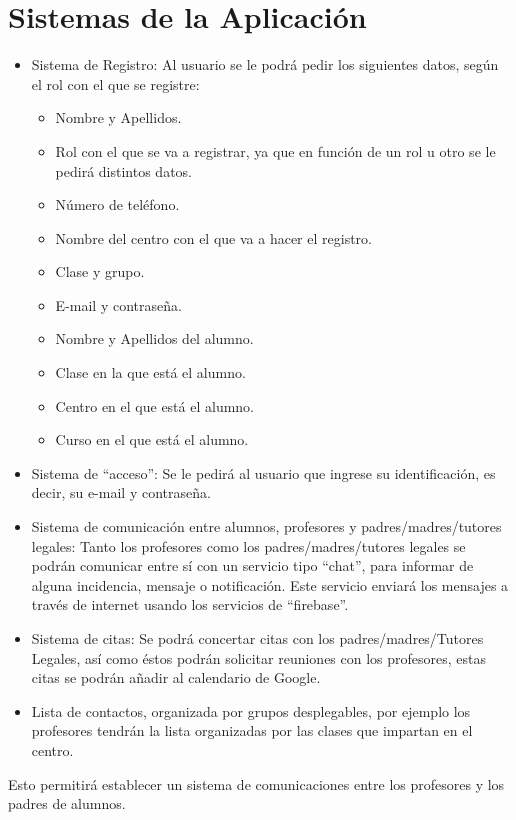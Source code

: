 	\section{Sistemas de la Aplicación}
		\begin{itemize}
			\item Sistema de Registro: Al usuario se le podrá pedir los siguientes datos, según el rol con el que se registre:
			\begin{itemize}
				\item Nombre y Apellidos.
				\item Rol con el que se va a registrar, ya que en función de un rol u otro se le pedirá distintos datos.
				\item Número de teléfono.
				\item Nombre del centro con el que va a hacer el registro.
				\item Clase y grupo.
				\item E-mail y contraseña.
				\item Nombre y Apellidos del alumno.
				\item Clase en la que está el alumno.
				\item Centro en el que está el alumno.
				\item Curso en el que está el alumno.
			\end{itemize}
			\item Sistema de ``acceso'': Se le pedirá al usuario que ingrese su identificación, es decir, su e-mail y contraseña.
			\item Sistema de comunicación entre alumnos, profesores y padres/madres/tutores legales: Tanto los profesores como los padres/madres/tutores legales se podrán comunicar entre sí con un servicio tipo ``chat'', para informar de alguna incidencia, mensaje o notificación. Este servicio enviará los mensajes a través de internet usando los servicios de ``firebase''.
			\item Sistema de citas: Se podrá concertar citas con los padres/madres/Tutores Legales, así como éstos podrán solicitar reuniones con los profesores, estas citas se podrán añadir al calendario de Google.
			\item Lista de contactos, organizada por grupos desplegables, por ejemplo los profesores tendrán la lista organizadas por las clases que impartan en el centro.
		\end{itemize}
	
		Esto permitirá establecer un sistema de comunicaciones entre los profesores y los padres de alumnos.

